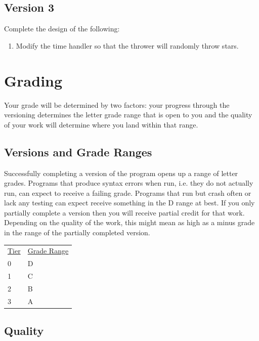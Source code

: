 \documentclass[nobib]{tufte-handout}
\begin{document}
\subsection{Version 3}

Complete the design of the following:
\begin{enumerate}
  \item Modify the time handler so that the thrower will randomly throw stars.
\end{enumerate}


\section*{Grading}

Your grade will be determined by two factors: your progress through the versioning determines the letter grade range that is open to you and the quality of your work will determine where you land within that range.

\subsection*{Versions and Grade Ranges}

Successfully completing a version of the program opens up a range of letter grades. Programs that produce syntax errors when run, i.e. they do not actually run, can expect to receive a failing grade. Programs that run but crash often or lack any testing can expect receive something in the D range at best. If you only partially complete a version then you will receive partial credit for that work. Depending on the quality of the work, this might mean as high as a minus grade in the range of the partially completed version.

\begin{tabular}{ll}
\underline{Tier} & \underline{Grade Range} \\
 0 & D \\
 1 & C \\
 2 & B \\
 3 & A
\end{tabular}


\subsection*{Quality}
\end{document}
